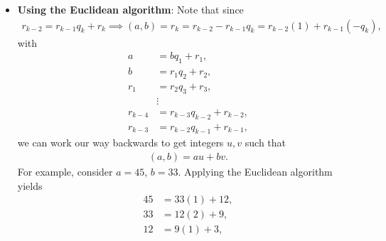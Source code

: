 \documentclass{report}
\begin{document}
\begin{itemize}
\begin{align*}
                (a,b) = (b, r_{1}) = (r_{1}, r_{2}) = \cdots = (r_{k-1}, r_{k}) = (r_{k}, 0) = r_{k}
            .\end{align*}
            Since $0 < r_{k} < r_{k-1} < \cdots < r_{2} < r_{1} < b$, each iteration produces a smaller $r_{i}$ than the one prior, and since all are greater than zero, the sequence must terminate in finite steps.
            \bigbreak \noindent 
            \textbf{Note}: We note that if $b < 0$, we cannot use the division algorithm, as that requires $b > 0$. This is why we assume $b$ is positive for this theorem. However, recall that
            \begin{align*}
                (a,b) = (-a,b)
            .\end{align*}
            This fact, along with $(a,b) = (b,a)$ lets us use the algorithm with
            \begin{align*}
                (a,-b)
            \end{align*}
            to find the gcd of $(a,b)$.
        \item \textbf{Using the Euclidean algorithm}: Note that since
            \begin{align*}
                r_{k-2} = r_{k-1}q_{k} + r_{k} \implies (a,b) = r_{k}  = r_{k-2}-r_{k-1}q_{k} = r_{k-2}(1) + r_{k-1}(-q_{k})
            ,\end{align*}
            with
            \begin{align*}
                a &= bq_{1} + r_{1}, \\
                b &= r_{1}q_{2} + r_{2}, \\
                r_{1} &= r_{2}q_{3} + r_{3}, \\
                      &\vdots \\
                r_{k-4} &= r_{k-3}q_{k-2} + r_{k-2}, \\
                r_{k-3} &= r_{k-2}q_{k-1} + r_{k-1}
            ,\end{align*}
            we can work our way backwards to get integers $u,v$ such that
            \begin{align*}
                (a,b) = au + bv
            .\end{align*}
            For example, consider $a = 45$, $b=33$. Applying the Euclidean algorithm yields
            \begin{align*}
                45 &= 33(1) + 12, \\
                33 &= 12(2) + 9, \\
                12 &= 9(1) + 3, \\

\end{align*}
\end{itemize}
\end{document}
